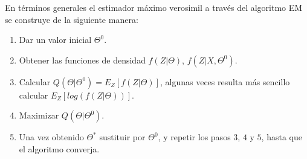 En términos generales el estimador máximo verosimil a través del algoritmo EM se construye de la siguiente manera:

\begin{enumerate}
	\item Dar un valor inicial $\Theta^{0}$.
	\item Obtener las funciones de densidad $f(Z|\Theta)$, $f(Z|X,\Theta^{0})$.
	\item Calcular $Q(\Theta|\Theta^{0})=E_{Z}[f(Z|\Theta)]$, algunas veces resulta más sencillo calcular $E_{Z}[log(f(Z|\Theta))]$.
	\item Maximizar $Q(\Theta|\Theta^{0})$. 
	\item Una vez obtenido $\Theta^{*}$ sustituir por $\Theta^{0}$, y repetir los pasos $3$, $4$ y $5$, hasta que el algoritmo converja.
	 
\end{enumerate}

